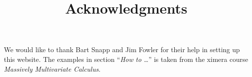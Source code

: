 \documentclass{ximera}
\title{Acknowledgments}
\begin{document}
\maketitle
We would like to thank Bart Snapp and Jim Fowler for their help in setting up this website.
The examples in section ``\emph{How to \ldots}'' is taken from the ximera course \emph{Massively Multivariate Calculus}. 
\end{document}
